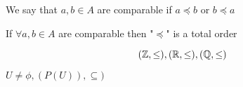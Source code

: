 \begin{definition}
    We say that $a,b \in A$ are comparable if $a \preccurlyeq b$ or $b \preccurlyeq a$
\end{definition}

\begin{definition}
    If $\forall a,b \in A$ are comparable then "$\preccurlyeq$" is a total order
\end{definition}

\begin{eg}
    
    $$ (\mathbb{Z}, \le), (\mathbb{R}, \le), (\mathbb{Q}, \le) $$ 
\end{eg}

\begin{eg}
    $U \ne \phi, (P(U)), \subseteq)$
\end{eg}









